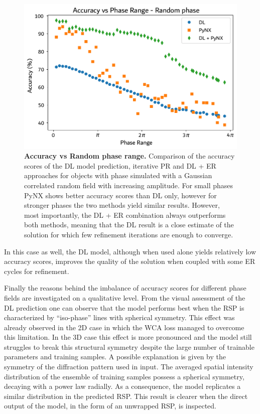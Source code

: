 \begin{figure}[H]
    \centering
    \includegraphics[width=\textwidth]{figures/Phasing/plot_acc_comparison_random_winter.pdf}
    \caption{\textbf{Accuracy vs Random phase range.} Comparison of the accuracy scores of the DL model prediction, iterative PR and DL + ER approaches for objects with 
    phase simulated with a Gaussian correlated random field with increasing amplitude. For small phases PyNX shows better 
    accuracy scores than DL only, however for stronger phases the two methods yield similar results. However, most importantly, 
    the DL + ER combination always outperforms both methods, meaning that the DL result is a close estimate of the 
    solution for which few refinement iterations are enough to converge.  }
    \label{fig:compare_random}
\end{figure}

In this case as well, the DL model, although when used alone yields relatively low accuracy scores, improves the quality of the 
solution when coupled with some ER cycles for refinement. 

Finally the reasons behind the imbalance of accuracy scores for different phase 
fields are investigated on a qualitative level. From the visual assessment of the DL prediction one can observe that 
the model performs best when the RSP is characterized by ``iso-phase'' lines with spherical symmetry. This effect was 
already observed in the 2D case in which the WCA loss managed to overcome this limitation. In the 3D case this effect is 
more pronounced and the model still struggles to break this structural symmetry despite the large number of trainable parameters 
and training samples. A possible explanation is given by the symmetry of the diffraction pattern used in input. The averaged 
spatial intensity distribution of the ensemble of training samples possess a spherical symmetry, decaying with a power 
law radially. As a consequence, the model replicates a similar distribution in the predicted RSP. This result is clearer 
when the direct output of the model, in the form of an unwrapped RSP, is inspected. 


